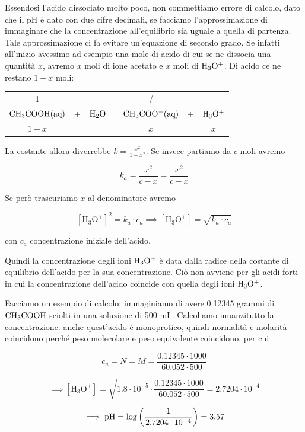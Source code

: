 Essendosi l'acido dissociato molto poco, non commettiamo errore di calcolo, dato che il pH è dato con due cifre decimali, se facciamo l'approssimazione di immaginare che la concentrazione all'equilibrio sia uguale a quella di partenza. Tale approssimazione ci fa evitare un'equazione di secondo grado. Se infatti all'inizio avessimo ad esempio una mole di acido di cui se ne dissocia una quantità $x$, avremo $x$ moli di ione acetato e $x$ moli di $\rm H_3O^+$. Di acido ce ne restano $1-x$ moli:

\begin{center}
    \begin{tabular}{ccccccc}
        1 &  &  & & / & &\\
        $\rm CH_3COOH(aq)$ & + & $\rm H_2O$ & \ce{<-->} & $\rm CH_3COO^-(aq)$ & + & $\rm H_3O^+$\\
        $1-x$ & & & & $x$ & & $x$\\
    \end{tabular}
\end{center}

La costante allora diverrebbe $\displaystyle k=\frac{x^2}{1-x^2}$. Se invece partiamo da $c$ moli avremo

$$k_a = \frac{x^2}{c-x}= \frac{x^2}{c-x}$$

Se però trascuriamo $x$ al denominatore avremo

$$[\text{H}_3\text{O}^+]^2= k_a \cdot c_a \implies [\text{H}_3\text{O}^+] = \sqrt{k_a \cdot c_a}$$

con $c_a$ concentrazione iniziale dell'acido.

Quindi la concentrazione degli ioni $\rm H_3O^+$ è data dalla radice della costante di equilibrio dell'acido per la sua concentrazione. Ciò non avviene per gli acidi forti in cui la concentrazione dell'acido coincide con quella degli ioni $\rm H_3O^+$.

Facciamo un esempio di calcolo: immaginiamo di avere 0.12345 grammi di $\rm CH_3COOH$ sciolti in una soluzione di 500 mL. Calcoliamo innanzitutto la concentrazione: anche quest'acido è monoprotico, quindi normalità e molarità coincidono perché peso molecolare e peso equivalente coincidono, per cui

$$c_a=N=M=\frac{0.12345 \cdot 1000}{60.052 \cdot 500}$$

$$\implies [\text{H}_3\text{O}^+]=\sqrt{1.8 \cdot 10^{-5} \cdot \frac{0.12345 \cdot 1000}{60.052 \cdot 500}}=2.7204 \cdot 10^{-4}$$

$$\implies \rm pH=\log \left( \frac{1}{2.7204 \cdot 10^{-4}} \right)=3.57$$

